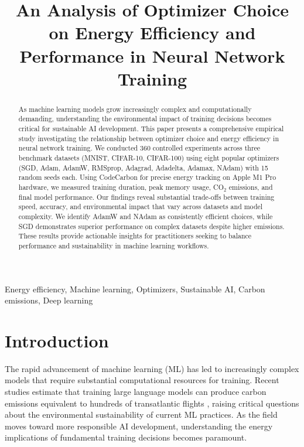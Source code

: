 \documentclass[conference]{IEEEtran}
\begin{document}
\title{An Analysis of Optimizer Choice on Energy Efficiency and Performance in Neural Network Training}

\author{
}

\maketitle

\begin{abstract}
As machine learning models grow increasingly complex and computationally demanding, understanding the environmental impact of training decisions becomes critical for sustainable AI development. This paper presents a comprehensive empirical study investigating the relationship between optimizer choice and energy efficiency in neural network training. We conducted 360 controlled experiments across three benchmark datasets (MNIST, CIFAR-10, CIFAR-100) using eight popular optimizers (SGD, Adam, AdamW, RMSprop, Adagrad, Adadelta, Adamax, NAdam) with 15 random seeds each. Using CodeCarbon for precise energy tracking on Apple M1 Pro hardware, we measured training duration, peak memory usage, CO$_2$ emissions, and final model performance. Our findings reveal substantial trade-offs between training speed, accuracy, and environmental impact that vary across datasets and model complexity. We identify AdamW and NAdam as consistently efficient choices, while SGD demonstrates superior performance on complex datasets despite higher emissions. These results provide actionable insights for practitioners seeking to balance performance and sustainability in machine learning workflows.
\end{abstract}

\begin{IEEEkeywords}
Energy efficiency, Machine learning, Optimizers, Sustainable AI, Carbon emissions, Deep learning
\end{IEEEkeywords}

\section{Introduction}

The rapid advancement of machine learning (ML) has led to increasingly complex models that require substantial computational resources for training. Recent studies estimate that training large language models can produce carbon emissions equivalent to hundreds of transatlantic flights \cite{strubell2019energy}, raising critical questions about the environmental sustainability of current ML practices. As the field moves toward more responsible AI development, understanding the energy implications of fundamental training decisions becomes paramount.
\end{document}
